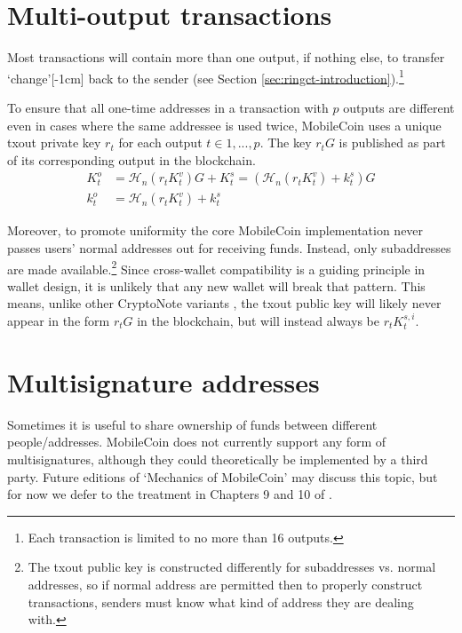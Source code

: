 \section{Multi-output transactions}
\label{sec:multi_out_transactions}

Most transactions will contain more than one output, if nothing else, to transfer `change’[-1cm] back to the sender (see Section \ref{sec:ringct-introduction}).\footnote{Each transaction is limited to no more than 16 outputs.}

To ensure that all one-time addresses in a transaction with $p$ outputs are different even in cases where the same addressee is used twice, MobileCoin uses a unique txout private key $r_t$ for each output $t \in 1, ..., p$. The key $r_t G$ is published as part of its corresponding output in the blockchain.\vspace{.175cm}
\begin{align*}
  K_t^o &= \mathcal{H}_n(r_t K_t^v)G + K_t^s = (\mathcal{H}_n(r_t K_t^v) + k_t^s)G  \\ 
  k_t^o &= \mathcal{H}_n(r_t K_t^v) + k_t^s
\end{align*} 

Moreover, to promote uniformity the core MobileCoin implementation never passes users' normal addresses out for receiving funds. Instead, only subaddresses are made available.\footnote{The txout public key is constructed differently for subaddresses vs. normal addresses, so if normal address are permitted then to properly construct transactions, senders must know what kind of address they are dealing with.} Since cross-wallet compatibility is a guiding principle in wallet design, it is unlikely that any new wallet will break that pattern. This means, unlike other CryptoNote variants \cite{cryptoNoteWhitePaper}, the txout public key will likely never appear in the form $r_t G$ in the blockchain, but will instead always be $r_t K^{s,i}_t$.



\section{Multisignature addresses}
\label{sec:multisignature-addresses}

Sometimes it is useful to share ownership of funds between different people/addresses. MobileCoin does not currently support any form of multisignatures, although they could theoretically be implemented by a third party. Future editions of `Mechanics of MobileCoin' may discuss this topic, but for now we defer to the treatment in Chapters 9 and 10 of \cite{ztm-2}.